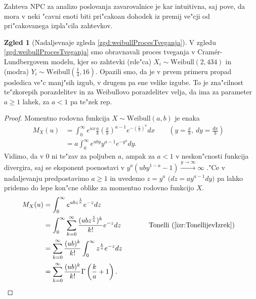 \documentclass[12pt, a4paper, reqno]{amsart}
\theoremstyle{definition}
\newtheorem{zgled}[definicija]{Zgled}
\theoremstyle{plain}
\newcommand{\1}{\mathds{1}}
\begin{document}
        Zahteva NPC za analizo poslovanja zavarovalnice je kar intuitivna, saj pove, da mora v 
        neki "cavni enoti biti pri"cakoan dohodek iz premij ve"cji od pri"cakovanega izpla"cila zahtevkov.

        \begin{zgled}[Nadaljevnaje zgleda \ref{zgd:weibullProcesTveganja}]
            V zgledu \ref{zgd:weibullProcesTveganja} smo obravnavali proces tveganja v Cramér-Lundbergovem 
            modelu, kjer so zahtevki (rde"ca) $X_i\sim\text{Weibull}(2, 434)$ in (modra) 
            $Y_i\sim\text{Weibull}(\tfrac{1}{4}, 16)$. Opazili smo, da je v prvem primeru propad
            posledica ve"c manj"sih izgub, v drugem pa ene velike izgube. To je zna"cilnost te"zkorepih
            porazdelitev in za Weibullovo porazdelitev velja, da ima za parameter
            $a \geq 1$ lahek, za $a<1$ pa te"zek rep.
            \begin{proof}
                Momentno rodovna funkcija $X\sim\text{Weibull}(a, b)$ je enaka
                \begin{align*}
                    M_X(u) &= \int_{0}^{\infty}e^{ux}\frac{a}{b}\left(\frac{x}{b}\right)^{a-1}e^{-\left(\frac{x}{b}\right)^a}dx \qquad \left(y = \tfrac{x}{b},\ dy = \tfrac{dx}{b}\right) \\
                           &= a\int_{0}^{\infty}e^{uby} y^{a-1}e^{-y^a}dy.
                \end{align*}
                Vidimo, da v $0$ ni te"zav za poljuben $a$, ampak za $a<1$ v neskon"cnosti funkcija 
                divergira, saj se 
                eksponent poenostavi v $y^a(uby^{1 - a} - 1)\xrightarrow{y\to\infty}\infty$ ."Ce v 
                nadaljevanju predpostavimo $a\geq 1$ in uvedemo $z = y^a$ 
                $\bigl(dz = ay^{a-1}dy\bigr)$ pa lahko pridemo do lepe kon"cne oblike 
                za momentno rodovno funkcijo $X$. \phantom{\qedhere}
                \begin{align*}
                    M_X(u) &= \int_{0}^{\infty}e^{ubz^{\frac{1}{a}}}e^{-z}dz \\
                           &= \int_{0}^{\infty}\sum_{k=0}^{\infty}\frac{(ubz^{\frac{1}{a}})^k}{k!}e^{-z}dz \qquad \qquad \text{Tonelli} \ (\ref{izr:TonellijevIzrek}) \\
                           &= \sum_{k=0}^{\infty}\frac{(ub)^k}{k!}\int_{0}^{\infty}z^{\frac{k}{a}}e^{-z}dz \\
                           &= \sum_{k=0}^{\infty}\frac{(ub)^k}{k!}\Gamma\left(\frac{k}{a} + 1\right).
                \end{align*} 
            \end{proof}
            \label{zgd:weibullLahkorepnaPorazdelitev}
        \end{zgled}
    
\end{document}

